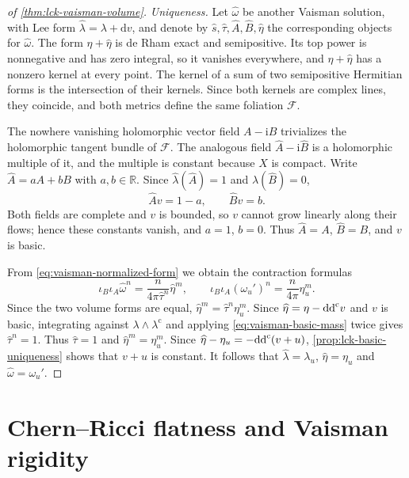 \begin{proof}[of \cref{thm:lck-vaisman-volume}]
\emph{Uniqueness.} Let $\widehat\omega$ be another Vaisman solution, with Lee form $\widehat\lambda=\lambda+\mathrm{d}v$, and denote by $\widehat s,\widehat\tau,\widehat A,\widehat B,\widehat\eta$ the corresponding objects for $\widehat\omega$. The form $\eta+\widehat\eta$ is de Rham exact and semipositive. Its top power is nonnegative and has zero integral, so it vanishes everywhere, and $\eta+\widehat\eta$ has a nonzero kernel at every point. The kernel of a sum of two semipositive Hermitian forms is the intersection of their kernels. Since both kernels are complex lines, they coincide, and both metrics define the same foliation $\mathcal F$.

The nowhere vanishing holomorphic vector field $A-\mathrm iB$ trivializes the holomorphic tangent bundle of $\mathcal F$. The analogous field $\widehat A-\mathrm i\widehat B$ is a holomorphic multiple of it, and the multiple is constant because $X$ is compact. Write $\widehat A=aA+bB$ with $a,b\in\mathbb R$. Since $\widehat\lambda(\widehat A)=1$ and $\widehat\lambda(\widehat B)=0$,
\[
 \widehat A v=1-a,\qquad \widehat B v=b.
\]
Both fields are complete and $v$ is bounded, so $v$ cannot grow linearly along their flows; hence these constants vanish, and $a=1$, $b=0$. Thus $\widehat A=A$, $\widehat B=B$, and $v$ is basic.

From \eqref{eq:vaisman-normalized-form} we obtain the contraction formulas
\begin{equation}\label{eq:vaisman-volume-contraction}
 \iota_B\iota_A\widehat\omega^n
 =\frac{n}{4\pi\widehat\tau^n}\widehat\eta^m,
 \qquad
 \iota_B\iota_A(\omega_u')^n=\frac{n}{4\pi}\eta_u^m.
\end{equation}
Since the two volume forms are equal, $\widehat\eta^m=\widehat\tau^n\eta_u^m$. Since $\widehat\eta=\eta-\mathrm{dd}^{\mathrm{c}} v$ and $v$ is basic, integrating against $\lambda\wedge\lambda^{\mathrm c}$ and applying \eqref{eq:vaisman-basic-mass} twice gives $\widehat\tau^n=1$. Thus $\widehat\tau=1$ and $\widehat\eta^m=\eta_u^m$. Since $\widehat\eta-\eta_u=-\mathrm{dd}^{\mathrm{c}}(v+u)$, \cref{prop:lck-basic-uniqueness} shows that $v+u$ is constant. It follows that $\widehat\lambda=\lambda_u$, $\widehat\eta=\eta_u$ and $\widehat\omega=\omega_u'$.
\end{proof}



\section{Chern--Ricci flatness and Vaisman rigidity}

